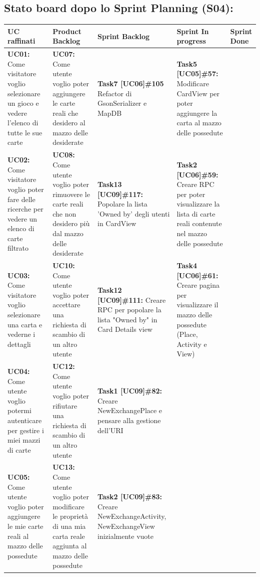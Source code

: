 \documentclass[a4paper, oneside]{article}
\begin{document}
\begin{landscape}
        \newpage
        \subsection{Stato board dopo lo Sprint Planning (S04):}
        \small
        \def\arraystretch{2}%
        \begin{tabular}{ | p{4.5cm} | p{5.5cm} | p{5.2cm} | p{5.8cm} | p{2cm}| }
            \hline
            \textbf{UC raffinati}
            & \textbf{Product Backlog}
            & \textbf{Sprint Backlog}
            & \textbf{Sprint In progress}
            & \textbf{Sprint Done} \\
            \hline
            \hline
            \textbf{UC01:} Come visitatore voglio selezionare un gioco e vedere l'elenco di tutte le sue carte
            &  \textbf{UC07:} Come utente voglio poter aggiungere le carte reali che desidero al mazzo delle desiderate  & \textbf{Task7 [UC06]\#105} Refactor di GsonSerializer e MapDB & \textbf{Task5 [UC05]\#57:} Modificare CardView per poter aggiungere la carta al mazzo delle possedute  & \\
            \hline
            \textbf{UC02:} Come visitatore voglio poter fare delle ricerche per vedere un elenco di carte filtrato
            &  \textbf{UC08:} Come utente voglio poter rimuovere le carte reali che non desidero più dal mazzo delle desiderate & \textbf{Task13 [UC09]\#117:} Popolare la lista 'Owned by' degli utenti in CardView & \textbf{Task2 [UC06]\#59:} Creare RPC per poter visualizzare la lista di carte reali contenute nel mazzo delle possedute  & \\
            \hline
            \textbf{UC03:} Come visitatore voglio selezionare una carta e vederne i dettagli
            & \textbf{UC10:} Come utente voglio poter accettare una richiesta di scambio di un altro utente & \textbf{Task12 [UC09]\#111:} Creare RPC per popolare la lista "Owned by" in Card Details view & \textbf{Task4 [UC06]\#61:} Creare pagina per visualizzare il mazzo delle possedute (Place, Activity e View) & \\
            \hline
            \textbf{UC04:}  Come utente voglio potermi autenticare per gestire i miei mazzi di carte & \textbf{UC12:} Come utente voglio poter rifiutare una richiesta di scambio di un altro utente & \textbf{Task1 [UC09]\#82:} Creare NewExchangePlace e pensare alla gestione dell'URI & & \\
            \hline
            \textbf{UC05:} Come utente voglio poter aggiungere le mie carte reali al mazzo delle possedute & \textbf{UC13:} Come utente voglio poter modificare le proprietà di una mia carta reale aggiunta al mazzo delle possedute & \textbf{Task2 [UC09]\#83:} Creare NewExchangeActivity, NewExchangeView inizialmente vuote & & \\

\end{tabular}
\end{landscape}
\end{document}
